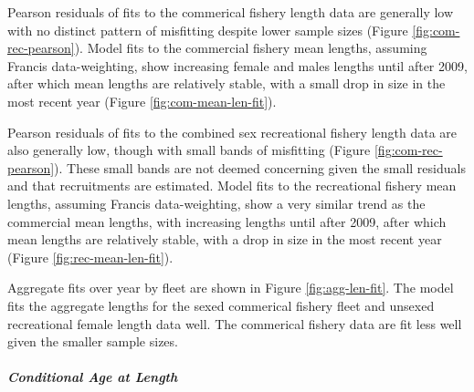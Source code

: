 \documentclass[11pt,
  english,
  a4paper,
]{article}
\begin{document}
\leavevmode\tagmcend\tagstructend\par


Pearson residuals of fits to the commerical fishery length data are generally low with no distinct pattern of misfitting despite lower sample sizes (Figure \ref{fig:com-rec-pearson}). Model fits to the commercial fishery mean lengths, assuming Francis data-weighting, show increasing female and males lengths until after 2009, after which mean lengths are relatively stable, with a small drop in size in the most recent year (Figure \ref{fig:com-mean-len-fit}).

\leavevmode\tagmcend\tagstructend\par


Pearson residuals of fits to the combined sex recreational fishery length data are also generally low, though with small bands of misfitting (Figure \ref{fig:com-rec-pearson}). These small bands are not deemed concerning given the small residuals and that recruitments are estimated. Model fits to the recreational fishery mean lengths, assuming Francis data-weighting, show a very similar trend as the commercial mean lengths, with increasing lengths until after 2009, after which mean lengths are relatively stable, with a drop in size in the most recent year (Figure \ref{fig:rec-mean-len-fit}).

\leavevmode\tagmcend\tagstructend\par


Aggregate fits over year by fleet are shown in Figure \ref{fig:agg-len-fit}. The model fits the aggregate lengths for the sexed commerical fishery fleet and unsexed recreational female length data well. The commerical fishery data are fit less well given the smaller sample sizes.

\leavevmode\tagmcend\tagstructend\par


\hypertarget{conditional-age-at-length}{%
\subparagraph{Conditional Age at Length}\label{conditional-age-at-length}}

\leavevmode\tagmcend\tagstructend

\end{document}
